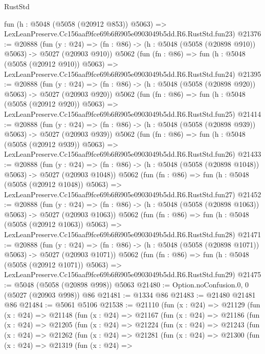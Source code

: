 \begin{lexlean}{RustStd}
\begin{coremodule}
    fun (h : @5048 (@5058 (@20912 @853)) @5063) =>
    LexLeanPreserve.Cc156aaf9fce69b6f6905e0903049b5dd.R6.RustStd.fun23)
@21376 := @20888
    (fun (y : @24) => (fn : @86) -> (h : @5048 (@5058 (@20898 @910)) @5063) -> @5027 (@20903 @910))
    @5062
    (fun (fn : @86) =>
    fun (h : @5048 (@5058 (@20912 @910)) @5063) =>
    LexLeanPreserve.Cc156aaf9fce69b6f6905e0903049b5dd.R6.RustStd.fun24)
@21395 := @20888
    (fun (y : @24) => (fn : @86) -> (h : @5048 (@5058 (@20898 @920)) @5063) -> @5027 (@20903 @920))
    @5062
    (fun (fn : @86) =>
    fun (h : @5048 (@5058 (@20912 @920)) @5063) =>
    LexLeanPreserve.Cc156aaf9fce69b6f6905e0903049b5dd.R6.RustStd.fun25)
@21414 := @20888
    (fun (y : @24) => (fn : @86) -> (h : @5048 (@5058 (@20898 @939)) @5063) -> @5027 (@20903 @939))
    @5062
    (fun (fn : @86) =>
    fun (h : @5048 (@5058 (@20912 @939)) @5063) =>
    LexLeanPreserve.Cc156aaf9fce69b6f6905e0903049b5dd.R6.RustStd.fun26)
@21433 := @20888
    (fun (y : @24) =>
    (fn : @86) -> (h : @5048 (@5058 (@20898 @1048)) @5063) -> @5027 (@20903 @1048))
    @5062
    (fun (fn : @86) =>
    fun (h : @5048 (@5058 (@20912 @1048)) @5063) =>
    LexLeanPreserve.Cc156aaf9fce69b6f6905e0903049b5dd.R6.RustStd.fun27)
@21452 := @20888
    (fun (y : @24) =>
    (fn : @86) -> (h : @5048 (@5058 (@20898 @1063)) @5063) -> @5027 (@20903 @1063))
    @5062
    (fun (fn : @86) =>
    fun (h : @5048 (@5058 (@20912 @1063)) @5063) =>
    LexLeanPreserve.Cc156aaf9fce69b6f6905e0903049b5dd.R6.RustStd.fun28)
@21471 := @20888
    (fun (y : @24) =>
    (fn : @86) -> (h : @5048 (@5058 (@20898 @1071)) @5063) -> @5027 (@20903 @1071))
    @5062
    (fun (fn : @86) =>
    fun (h : @5048 (@5058 (@20912 @1071)) @5063) =>
    LexLeanPreserve.Cc156aaf9fce69b6f6905e0903049b5dd.R6.RustStd.fun29)
@21475 := @5048 (@5058 (@20898 @998)) @5063
@21480 := Option.noConfusion.{0, 0} (@5027 (@20903 @998)) @86
@21481 := @1334 @86
@21483 := @21480 @21481 @86
@21484 := @5061 @5106
@21538 := @21110
    (fun (x : @24) =>
    @21129
      (fun (x : @24) =>
      @21148
        (fun (x : @24) =>
        @21167
          (fun (x : @24) =>
          @21186
            (fun (x : @24) =>
            @21205
              (fun (x : @24) =>
              @21224
                (fun (x : @24) =>
                @21243
                  (fun (x : @24) =>
                  @21262
                    (fun (x : @24) =>
                    @21281
                      (fun (x : @24) =>
                      @21300
                        (fun (x : @24) =>
                        @21319
                          (fun (x : @24) =>

\end{coremodule}
\end{lexlean}
